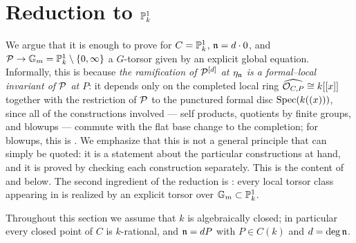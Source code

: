 \section{Reduction to \texorpdfstring{$\mathbb{P}^1_k$}{P1}}

We argue that it is enough to prove  for $C=\mathbb{P}^1_k$, $\mathfrak{n} = d \cdot 0$, and $\mathcal{P} \to \mathbb{G}_m = \mathbb{P}^1_k \setminus \{0, \infty\}$ a $G$-torsor given by an explicit global equation.
Informally, this is because \emph{the ramification of $\mathcal{P}^{[d]}$ at $\eta_{\mathfrak{n}}$ is a formal--local invariant of $\mathcal{P}$ at $P$}:
it depends only on the completed local ring $\widehat{\mathcal{O}_{C,P}} \cong k[[x]]$ together with the restriction of $\mathcal{P}$
to the punctured formal disc $\operatorname{Spec}(k((x)))$, since all of the constructions involved --- self products, quotients by finite
groups, and blowups --- commute with the flat base change to the completion; for blowups, this is
.
We emphasize that this is not a general principle that can simply be quoted: it is a statement about the particular
constructions at hand, and it is proved by checking each construction separately. This is the content of
 and  below.
The second ingredient of the reduction is : every local torsor class appearing in
 is realized by an explicit torsor over $\mathbb{G}_m \subset \mathbb{P}^1_k$.

Throughout this section we assume that $k$ is algebraically closed; in particular every closed point of $C$ is $k$-rational, and $\mathfrak{n} = dP$ with $P \in C(k)$ and $d = \deg \mathfrak{n}$.

